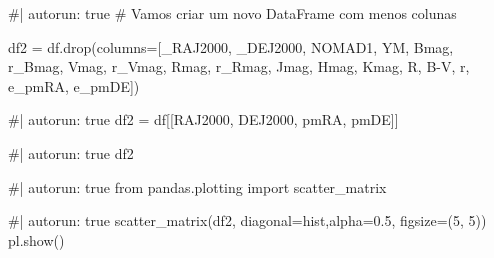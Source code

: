 \documentclass[
  letterpaper,
  DIV=11,
  numbers=noendperiod]{scrreprt}
\newenvironment{Shaded}{\begin{snugshade}}{\end{snugshade}}
\newcommand{\NormalTok}[1]{\textcolor[rgb]{0.00,0.23,0.31}{#1}}
\begin{document}
\begin{Shaded}
\begin{Highlighting}[]
\NormalTok{\#| autorun: true}
\NormalTok{\# Vamos criar um novo DataFrame com menos colunas}

\NormalTok{df2 = df.drop(columns=[\textquotesingle{}\_RAJ2000\textquotesingle{}, \textquotesingle{}\_DEJ2000\textquotesingle{}, }
\NormalTok{                       \textquotesingle{}NOMAD1\textquotesingle{}, \textquotesingle{}YM\textquotesingle{}, \textquotesingle{}Bmag\textquotesingle{}, }
\NormalTok{                       \textquotesingle{}r\_Bmag\textquotesingle{}, \textquotesingle{}Vmag\textquotesingle{}, \textquotesingle{}r\_Vmag\textquotesingle{},}
\NormalTok{                       \textquotesingle{}Rmag\textquotesingle{}, \textquotesingle{}r\_Rmag\textquotesingle{}, \textquotesingle{}Jmag\textquotesingle{}, }
\NormalTok{                       \textquotesingle{}Hmag\textquotesingle{}, \textquotesingle{}Kmag\textquotesingle{}, \textquotesingle{}R\textquotesingle{}, }
\NormalTok{                       \textquotesingle{}B{-}V\textquotesingle{}, \textquotesingle{}r\textquotesingle{}, \textquotesingle{}e\_pmRA\textquotesingle{}, \textquotesingle{}e\_pmDE\textquotesingle{}])}
\end{Highlighting}
\end{Shaded}

\begin{Shaded}
\begin{Highlighting}[]
\NormalTok{\#| autorun: true}
\NormalTok{df2 = df[[\textquotesingle{}RAJ2000\textquotesingle{}, \textquotesingle{}DEJ2000\textquotesingle{}, \textquotesingle{}pmRA\textquotesingle{}, \textquotesingle{}pmDE\textquotesingle{}]]}
\end{Highlighting}
\end{Shaded}

\begin{Shaded}
\begin{Highlighting}[]
\NormalTok{\#| autorun: true}
\NormalTok{df2}
\end{Highlighting}
\end{Shaded}

\begin{Shaded}
\begin{Highlighting}[]
\NormalTok{\#| autorun: true}
\NormalTok{from pandas.plotting import scatter\_matrix}
\end{Highlighting}
\end{Shaded}

\begin{Shaded}
\begin{Highlighting}[]
\NormalTok{\#| autorun: true}
\NormalTok{scatter\_matrix(df2,  diagonal=\textquotesingle{}hist\textquotesingle{},alpha=0.5, figsize=(5, 5))}
\NormalTok{pl.show()}
\end{Highlighting}
\end{Shaded}
\end{document}
